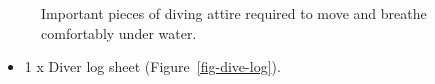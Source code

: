 \documentclass[
  letterpaper,
  DIV=11,
  numbers=noendperiod]{scrreprt}
\providecommand{\tightlist}{%
  \setlength{\itemsep}{0pt}\setlength{\parskip}{0pt}}\usepackage{longtable,booktabs,array}
\begin{document}
\begin{figure}[H]

\begin{minipage}[t]{0.50\linewidth}

{\centering 


}

\end{minipage}%
%
\begin{minipage}[t]{0.50\linewidth}

{\centering 


}

\end{minipage}%
\newline
\begin{minipage}[t]{0.50\linewidth}

{\centering 


}

\end{minipage}%
%
\begin{minipage}[t]{0.50\linewidth}

{\centering 


}

\end{minipage}%

\caption{\label{fig-dive-tools}Important pieces of diving attire
required to move and breathe comfortably under water.}

\end{figure}

\begin{itemize}
\tightlist
\item
  1 x Diver log sheet (Figure~\ref{fig-dive-log}).
\end{itemize}
\end{document}
